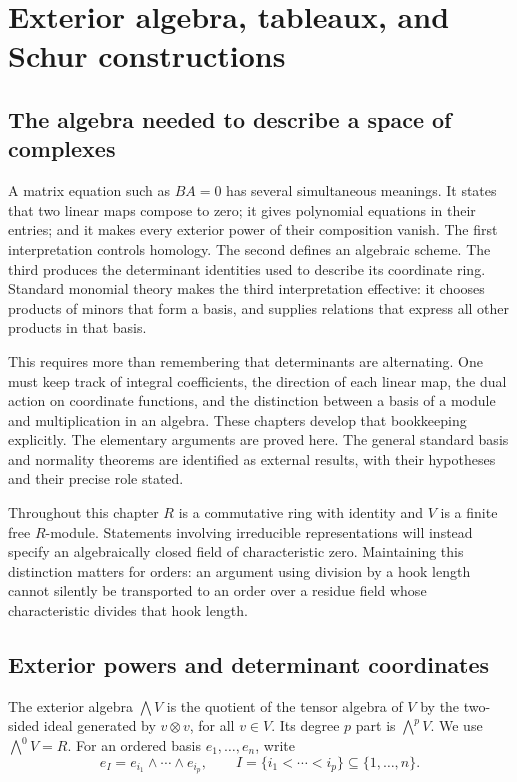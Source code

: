 \chapter{Exterior algebra, tableaux, and Schur constructions}
\label{chap:exterior-schur}

\section{The algebra needed to describe a space of complexes}

A matrix equation such as \(BA=0\) has several simultaneous meanings.
It states that two linear maps compose to zero; it gives polynomial
equations in their entries; and it makes every exterior power of their
composition vanish.  The first interpretation controls homology.  The
second defines an algebraic scheme.  The third produces the determinant
identities used to describe its coordinate ring.  Standard monomial
theory makes the third interpretation effective: it chooses products of
minors that form a basis, and supplies relations that express all other
products in that basis.

This requires more than remembering that determinants are alternating.
One must keep track of integral coefficients, the direction of each
linear map, the dual action on coordinate functions, and the distinction
between a basis of a module and multiplication in an algebra.  These
chapters develop that bookkeeping explicitly.  The elementary arguments
are proved here.  The general standard basis and normality theorems are
identified as external results, with their hypotheses and their precise
role stated.

Throughout this chapter \(R\) is a commutative ring with identity and
\(V\) is a finite free \(R\)-module.  Statements involving irreducible
representations will instead specify an algebraically closed field of
characteristic zero.  Maintaining this distinction matters for orders:
an argument using division by a hook length cannot silently be
transported to an order over a residue field whose characteristic divides
that hook length.

\section{Exterior powers and determinant coordinates}

\begin{definition}
The exterior algebra \(\bigwedge V\) is the quotient of the tensor algebra
of \(V\) by the two-sided ideal generated by \(v\otimes v\), for all
\(v\in V\).  Its degree \(p\) part is \(\bigwedge^p V\).
We use \(\bigwedge^0V=R\).  For an ordered basis
\(e_1,\ldots,e_n\), write
\[
 e_I=e_{i_1}\wedge\cdots\wedge e_{i_p},
 \qquad I=\{i_1<\cdots<i_p\}\subseteq\{1,\ldots,n\}.
\]
\end{definition}

